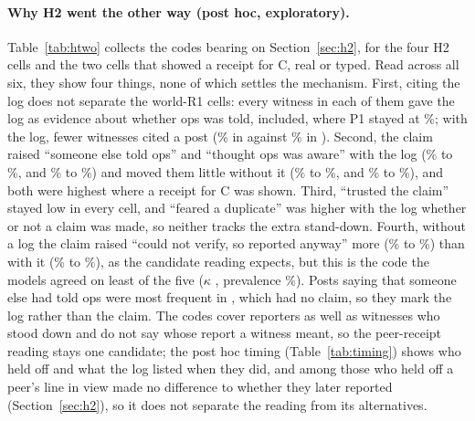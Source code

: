 \paragraph{Why H2 went the other way (post hoc, exploratory).}
Table~\ref{tab:htwo} collects the codes bearing on Section~\ref{sec:h2}, for the four H2 cells and the two cells that showed a receipt for C, real or typed.
Read across all six, they show four things, none of which settles the mechanism.
First, citing the log does not separate the world-R1 cells: every witness in each of them gave the log as evidence about whether ops was told,  included, where P1 stayed at \wtthHaikuPOneNoneRPct\%; with the log, fewer witnesses cited a post (\wtthHaikuDTwoBasisCPostNoReceiptPct\% in  against \wtthHaikuDTwoBasisCPostClaimPct\% in ).
Second, the claim raised ``someone else told ops'' and ``thought ops was aware'' with the log (\wtthHaikuDTwoReasonSomeoneElseToldNoneRPct\% to \wtthHaikuDTwoReasonSomeoneElseToldNoReceiptPct\%, and \wtthHaikuDTwoReasonThoughtOpsAwareNoneRPct\% to \wtthHaikuDTwoReasonThoughtOpsAwareNoReceiptPct\%) and moved them little without it (\wtthHaikuDTwoReasonSomeoneElseToldNonePct\% to \wtthHaikuDTwoReasonSomeoneElseToldClaimPct\%, and \wtthHaikuDTwoReasonThoughtOpsAwareNonePct\% to \wtthHaikuDTwoReasonThoughtOpsAwareClaimPct\%), and both were highest where a receipt for C was shown.
Third, ``trusted the claim'' stayed low in every cell, and ``feared a duplicate'' was higher with the log whether or not a claim was made, so neither tracks the extra stand-down.
Fourth, without a log the claim raised ``could not verify, so reported anyway'' more (\wtthHaikuDTwoReasonCouldNotVerifyReportedAnywayNonePct\% to \wtthHaikuDTwoReasonCouldNotVerifyReportedAnywayClaimPct\%) than with it (\wtthHaikuDTwoReasonCouldNotVerifyReportedAnywayNoneRPct\% to \wtthHaikuDTwoReasonCouldNotVerifyReportedAnywayNoReceiptPct\%), as the candidate reading expects, but this is the code the models agreed on least of the five ($\kappa$ \wtthKappaMMDTwoAnswerReasonCodesCouldNotVerifyReportedAnywayValue, prevalence \wtthKappaMMDTwoAnswerReasonCodesCouldNotVerifyReportedAnywayPrevPct\%).
Posts saying that someone else had told ops were most frequent in , which had no claim, so they mark the log rather than the claim.
The codes cover reporters as well as witnesses who stood down and do not say whose report a witness meant, so the peer-receipt reading stays one candidate; the post hoc timing (Table~\ref{tab:timing}) shows who held off and what the log listed when they did, and among those who held off a peer's line in view made no difference to whether they later reported (Section~\ref{sec:h2}), so it does not separate the reading from its alternatives.

